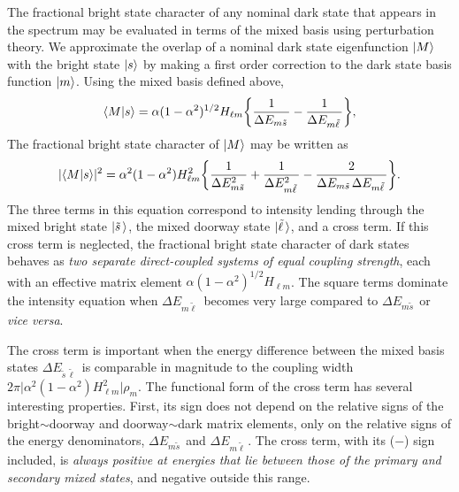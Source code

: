 \documentclass[12pt]{mitthesis}
\newcommand{\ts}{\tilde{s}\,}
\newcommand{\tl}{\tilde{\ell}\,}
\begin{document}
The fractional bright state character of any nominal dark state that
appears in the spectrum may be evaluated in terms of the mixed basis
using perturbation theory. We approximate the overlap of a nominal
dark state eigenfunction $\mathinner{|{M}\rangle}$ with the bright state $\mathinner{|{s}\rangle}$ by
making a first order correction to the dark state basis function
$\mathinner{|{m}\rangle}$.  Using the mixed basis defined above,
\begin{equation}
  \label{eq:mixed-basis-overlap}
  \braket{M|s} = \alpha (1 - \alpha^2)^{1/2} H_{\ell m}
  \biggl \lbrace
    \frac{1}{\Delta E_{m \ts}} - \frac{1}{\Delta E_{m \tl}}
  \biggr \rbrace,
\end{equation}
The fractional bright state character of $\mathinner{|{M}\rangle}$ may be written as
\begin{equation}
  \label{eq:mixed-basis-int}
  \lvert \braket{M|s} \rvert^2 = 
  \alpha^2 (1-\alpha^2) H_{\ell m}^2 
   \biggl \lbrace 
   \frac{1}{\Delta E_{m \ts}^2} +\frac{1}{\Delta E_{m \tl}^2} 
   - \frac{2}{\Delta E_{m \ts} \Delta E_{m \tl}}
   \biggr \rbrace.
\end{equation}
The three terms in this equation correspond to intensity lending
through the mixed bright state $\ket{\ts}$, the mixed doorway state
$\ket{\tl}$, and a cross term.  If this cross term is neglected, the
fractional bright state character of dark states behaves as \emph{two
  separate direct-coupled systems of equal coupling strength}, each
with an effective matrix element $\alpha (1-\alpha^2)^{1/2} H_{\ell
  m}$. The square terms dominate the intensity equation when $\Delta
E_{m \tl}$ becomes very large compared to $\Delta E_{m \ts}$ or
\emph{vice versa}.

The cross term is important when the energy difference
between the mixed basis states $\Delta E_{\ts \tl}$ is comparable in
magnitude to the coupling width $2 \pi \lvert \alpha^2 (1-\alpha^2)
H_{\ell m}^2 \rvert \rho_m$.
The functional form of the cross term has several interesting
properties.  First, its sign does not depend on the relative signs of
the bright$\sim$doorway and doorway$\sim$dark matrix elements, only on
the relative signs of the energy denominators, $\Delta E_{m \ts}$ and
$\Delta E_{m \tl}$. The cross term, with its ($-$) sign included, is
\emph{always positive at energies that lie between those of the
  primary and secondary mixed states}, and negative outside this
range.
\end{document}
